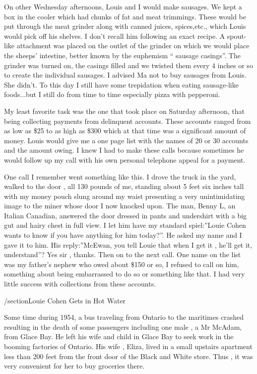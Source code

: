 On other Wednesday afternoons, Louis and I would make sausages. We kept a box in the cooler which had chunks of fat and meat trimmings. These would be put through the meat grinder along with canned juices, spices,etc., which Louis would pick off his shelves. I don't recall him following an exact recipe. A spout-like attachment was placed on the outlet of the grinder on which we would place the sheeps' intestine, better known by the euphemism “ sausage casings”. The grinder was turned on, the casings filled and we twisted them every 4 inches or so to create the individual sausages. I advised Ma not to buy sausages from Louis. She didn't. To this day I still have some trepidation when eating sausage-like foods...but I still do from time to time especially pizza with pepperoni.

My least favorite task was the one that took place on Saturday afternoon, that being collecting payments from delinquent accounts. These accounts ranged from as low as \$25 to as high as \$300 which at that time was a significant amount of money. Louis would give me a one page list with the names of 20 or 30 accounts and the amount owing. I knew I had to make these calls because sometimes he would follow up my call with his own personal telephone appeal for a payment. 

One call I remember went something like this. I drove the truck in the yard, walked to the door , all 130 pounds of me, standing about 5 feet six inches tall with my money pouch slung around my waist presenting a very unintimidating image to the miner whose door I now knocked upon. The man, Benny L, an Italian Canadian, answered the door dressed in pants and undershirt with a big gut and hairy chest in full view. I let him have my standard spiel:”Louie Cohen wants to know if you have anything for him today?”. He asked my name and I gave it to him. His reply:”McEwan, you tell Louie that when I get it , he'll get it, understand”? Yes sir , thanks. Then on to the next call. One name on the list was my father's nephew who owed about \$150 or so, I refused to call on him, something about being embarrassed to do so or something like that. I had very little success with collections from these accounts. 

/section{Louie Cohen Gets in Hot Water}

Some time during 1954, a bus traveling from Ontario to the maritimes crashed resulting in the death of some passengers including one male , a Mr McAdam, from Glace Bay. He left his wife and child in Glace Bay to seek work in the booming factories of Ontario. His wife , Eliza, lived in a small upstairs apartment less than 200 feet from the front door of the Black and White store. Thus , it was very convenient for her to buy groceries there.

